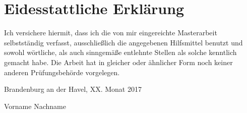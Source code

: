 \documentclass[
12pt,
english,
ngerman,
headsepline,
twoside,
openright,
numbers=noenddot,version=first
]{scrreprt}
\begin{document}




\chapter*{Eidesstattliche Erklärung}

Ich versichere hiermit, dass ich die von mir eingereichte Masterarbeit selbstständig verfasst, ausschließlich die angegebenen Hilfsmittel benutzt und sowohl wörtliche, als auch sinngemäße entlehnte Stellen als solche kenntlich gemacht habe. Die Arbeit hat in gleicher oder ähnlicher Form noch keiner anderen Prüfungsbehörde vorgelegen.

Brandenburg an der Havel, XX. Monat 2017

\vspace{3cm}

Vorname Nachname
\end{document}
